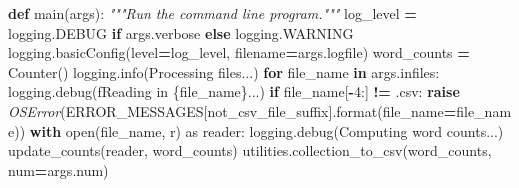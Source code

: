 \documentclass[
]{krantz}
\makeatletter
\newenvironment{Shaded}{\begin{snugshade}}{\end{snugshade}}
\newcommand{\BuiltInTok}[1]{#1}
\newcommand{\CommentTok}[1]{\textcolor[rgb]{0.56,0.35,0.01}{\textit{#1}}}
\newcommand{\ControlFlowTok}[1]{\textcolor[rgb]{0.13,0.29,0.53}{\textbf{#1}}}
\newcommand{\DecValTok}[1]{\textcolor[rgb]{0.00,0.00,0.81}{#1}}
\newcommand{\ImportTok}[1]{#1}
\newcommand{\KeywordTok}[1]{\textcolor[rgb]{0.13,0.29,0.53}{\textbf{#1}}}
\newcommand{\NormalTok}[1]{#1}
\newcommand{\OperatorTok}[1]{\textcolor[rgb]{0.81,0.36,0.00}{\textbf{#1}}}
\newcommand{\PreprocessorTok}[1]{\textcolor[rgb]{0.56,0.35,0.01}{\textit{#1}}}
\newcommand{\SpecialCharTok}[1]{\textcolor[rgb]{0.00,0.00,0.00}{#1}}
\newcommand{\SpecialStringTok}[1]{\textcolor[rgb]{0.31,0.60,0.02}{#1}}
\newcommand{\StringTok}[1]{\textcolor[rgb]{0.31,0.60,0.02}{#1}}
\newenvironment{kframe}{%
\medskip{}
\setlength{\fboxsep}{.8em}
 \def\at@end@of@kframe{}%
 \ifinner\ifhmode%
  \def\at@end@of@kframe{\end{minipage}}%
  \begin{minipage}{\columnwidth}%
 \fi\fi%
 \def\FrameCommand##1{\hskip\@totalleftmargin \hskip-\fboxsep
 \colorbox{shadecolor}{##1}\hskip-\fboxsep
     \hskip-\linewidth \hskip-\@totalleftmargin \hskip\columnwidth}%
 \MakeFramed {\advance\hsize-\width
   \@totalleftmargin\z@ \linewidth\hsize
   \@setminipage}}%
 {\par\unskip\endMakeFramed%
 \at@end@of@kframe}
\renewenvironment{Shaded}{\begin{kframe}}{\end{kframe}}
\makeatother
\begin{document}
\begin{Shaded}
\begin{Highlighting}[]
\KeywordTok{def}\NormalTok{ main(args):}
    \CommentTok{"""Run the command line program."""}
\NormalTok{    log\_level }\OperatorTok{=}\NormalTok{ logging.DEBUG }\ControlFlowTok{if}\NormalTok{ args.verbose }\ControlFlowTok{else}\NormalTok{ logging.WARNING}
\NormalTok{    logging.basicConfig(level}\OperatorTok{=}\NormalTok{log\_level, filename}\OperatorTok{=}\NormalTok{args.logfile)}
\NormalTok{    word\_counts }\OperatorTok{=}\NormalTok{ Counter()}
\NormalTok{    logging.info(}\StringTok{\textquotesingle{}Processing files...\textquotesingle{}}\NormalTok{)}
    \ControlFlowTok{for}\NormalTok{ file\_name }\KeywordTok{in}\NormalTok{ args.infiles:}
\NormalTok{        logging.debug(}\SpecialStringTok{f\textquotesingle{}Reading in }\SpecialCharTok{\{}\NormalTok{file\_name}\SpecialCharTok{\}}\SpecialStringTok{...\textquotesingle{}}\NormalTok{)}
        \ControlFlowTok{if}\NormalTok{ file\_name[}\OperatorTok{{-}}\DecValTok{4}\NormalTok{:] }\OperatorTok{!=} \StringTok{\textquotesingle{}.csv\textquotesingle{}}\NormalTok{:}
            \ControlFlowTok{raise} \PreprocessorTok{OSError}\NormalTok{(ERROR\_MESSAGES[}\StringTok{\textquotesingle{}not\_csv\_file\_suffix\textquotesingle{}}\NormalTok{].}\BuiltInTok{format}\NormalTok{(file\_name}\OperatorTok{=}\NormalTok{file\_name))}
        \ControlFlowTok{with} \BuiltInTok{open}\NormalTok{(file\_name, }\StringTok{\textquotesingle{}r\textquotesingle{}}\NormalTok{) }\ImportTok{as}\NormalTok{ reader:}
\NormalTok{            logging.debug(}\StringTok{\textquotesingle{}Computing word counts...\textquotesingle{}}\NormalTok{)}
\NormalTok{            update\_counts(reader, word\_counts)}
\NormalTok{    utilities.collection\_to\_csv(word\_counts, num}\OperatorTok{=}\NormalTok{args.num)}


\end{Highlighting}
\end{Shaded}
\end{document}
